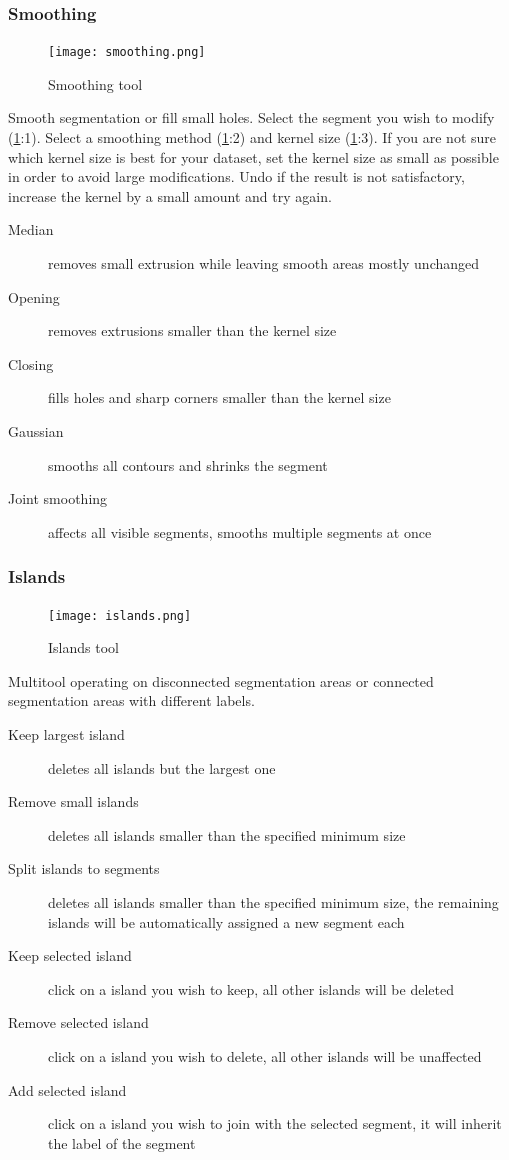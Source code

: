 \subsubsection{Smoothing}
\begin{figure}[h!]
	\centerline{
		\texttt{[image: smoothing.png]}}
	\caption{Smoothing tool}\label{fig:smoothing}
\end{figure}
\noindent
Smooth segmentation or fill small holes.
Select the segment you wish to modify (\cref{fig:smoothing}:1).
Select a smoothing method (\cref{fig:smoothing}:2) and kernel size (\cref{fig:smoothing}:3). If you are not sure which kernel size is best for your dataset, set the kernel size as small as possible in order to avoid large modifications.
Undo if the result is not satisfactory, increase the kernel by a small amount and try again.
\begin{description}
	\item [Median] removes small extrusion while leaving smooth areas mostly unchanged
	\item [Opening] removes extrusions smaller than the kernel size
	\item [Closing] fills holes and sharp corners smaller than the kernel size
	\item [Gaussian] smooths all contours and shrinks the segment
	\item [Joint smoothing] affects all visible segments, smooths multiple segments at once
\end{description}

\pagebreak
\subsubsection{Islands}
\begin{figure}[h!]
	\centerline{
		\texttt{[image: islands.png]}}
	\caption{Islands tool}\label{fig:islands}
\end{figure}
\noindent
Multitool operating on disconnected segmentation areas or connected segmentation areas with different labels.
\begin{description}
	\item [Keep largest island] deletes all islands but the largest one
	\item [Remove small islands] deletes all islands smaller than the specified minimum size
	\item [Split islands to segments] deletes all islands smaller than the specified minimum size, the remaining islands will be automatically assigned a new segment each
	\item [Keep selected island] click on a island you wish to keep, all other islands will be deleted
	\item [Remove selected island] click on a island you wish to delete, all other islands will be unaffected
	\item [Add selected island] click on a island you wish to join with the selected segment, it will inherit the label of the segment
\end{description}
\pagebreak
